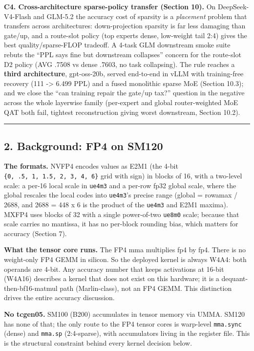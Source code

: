 \documentclass[
]{article}
\begin{document}
\textbf{C4. Cross-architecture sparse-policy transfer (Section 10).} On
DeepSeek-V4-Flash and GLM-5.2 the accuracy cost of sparsity is a
\emph{placement} problem that transfers across architectures:
down-projection sparsity is far less damaging than gate/up, and a
route-slot policy (top experts dense, low-weight tail 2:4) gives the
best quality/sparse-FLOP tradeoff. A 4-task GLM downstream smoke suite
rebuts the ``PPL says fine but downstream collapses'' concern for the
route-slot D2 policy (AVG .7508 vs dense .7603, no task collapsing). The
rule reaches a \textbf{third architecture}, gpt-oss-20b, served
end-to-end in vLLM with training-free recovery (111 -\textgreater{}
6.499 PPL) and a fused monolithic sparse MoE (Section 10.3); and we
close the ``can training repair the gate/up tax?'' question in the
negative across the whole layerwise family (per-expert and global
router-weighted MoE QAT both fail, tightest reconstruction giving worst
downstream, Section 10.2).

\begin{center}\rule{0.5\linewidth}{0.5pt}\end{center}

\subsection{2. Background: FP4 on SM120}\label{background-fp4-on-sm120}

\textbf{The formats.} NVFP4 encodes values as E2M1 (the 4-bit
\texttt{\{0,\ .5,\ 1,\ 1.5,\ 2,\ 3,\ 4,\ 6\}} grid with sign) in blocks
of 16, with a two-level scale: a per-16 local scale in \texttt{ue4m3}
and a per-row fp32 global scale, where the global rescales the local
codes into \texttt{ue4m3}'s precise range (global = rowamax / 2688, and
2688 = 448 x 6 is the product of the \texttt{ue4m3} and E2M1 maxima).
MXFP4 uses blocks of 32 with a single power-of-two \texttt{ue8m0} scale;
because that scale carries no mantissa, it has no per-block rounding
bias, which matters for accuracy (Section 7).

\textbf{What the tensor core runs.} The FP4 mma multiplies fp4 by fp4.
There is no weight-only FP4 GEMM in silicon. So the deployed kernel is
always W4A4: both operands are 4-bit. Any accuracy number that keeps
activations at 16-bit (W4A16) describes a kernel that does not exist on
this hardware; it is a dequant-then-bf16-matmul path (Marlin-class), not
an FP4 GEMM. This distinction drives the entire accuracy discussion.

\textbf{No tcgen05.} SM100 (B200) accumulates in tensor memory via UMMA.
SM120 has none of that; the only route to the FP4 tensor cores is
warp-level \texttt{mma.sync} (dense) and \texttt{mma.sp} (2:4-sparse),
with accumulators living in the register file. This is the structural
constraint behind every kernel decision below.
\end{document}
